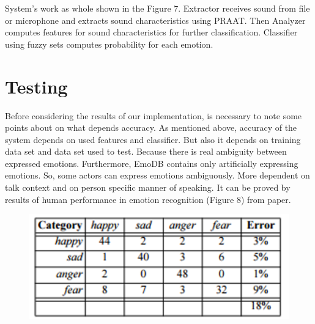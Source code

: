\documentclass[14pt]{extarticle}
\begin{document}
System's work as whole shown in the Figure 7. Extractor receives sound from file or microphone and extracts sound characteristics using PRAAT. Then Analyzer computes features for sound characteristics for further classification. Classifier using fuzzy sets computes probability for each emotion.

\section{Testing}
Before considering the results of our implementation, is necessary to note some points about on what depends accuracy. As mentioned above, accuracy of the system depends on used features and classifier. But also it depends on training data set and data set used to test. Because there is real ambiguity between expressed emotions. Furthermore, EmoDB contains only artificially expressing emotions. So, some actors can express emotions ambiguously. More dependent on talk context and on person specific manner of speaking. It can be proved by results of human performance in emotion recognition (Figure 8) from \cite{frankthomas} paper.
\begin{figure}[h]
	\centering
	\includegraphics[scale=0.3]{images/h_performance.png}
	\caption{}
	\label{fig:human-perforance}
\end{figure}
\end{document}
